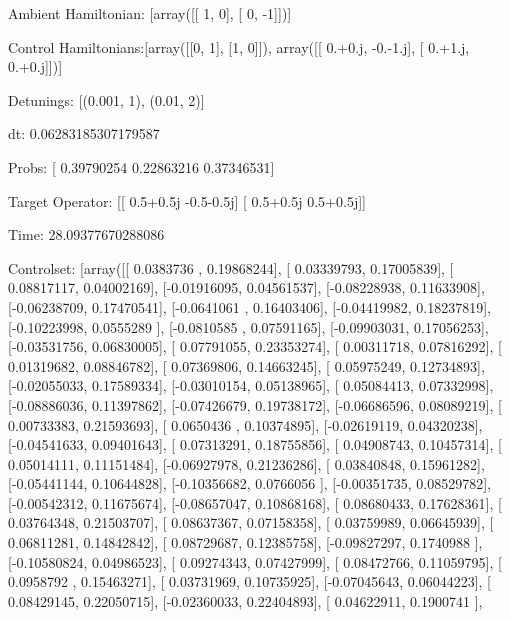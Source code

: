 \documentclass{article}
\begin{document}
    

\newpage

Ambient Hamiltonian: [array([[ 1,  0],
       [ 0, -1]])]

Control Hamiltonians:[array([[0, 1],
       [1, 0]]), array([[ 0.+0.j, -0.-1.j],
       [ 0.+1.j,  0.+0.j]])]

Detunings: [(0.001, 1), (0.01, 2)]

 dt: 0.06283185307179587

Probs: [ 0.39790254  0.22863216  0.37346531]

Target Operator: [[ 0.5+0.5j -0.5-0.5j]
 [ 0.5+0.5j  0.5+0.5j]]

Time: 28.09377670288086

Controlset: [array([[ 0.0383736 ,  0.19868244],
       [ 0.03339793,  0.17005839],
       [ 0.08817117,  0.04002169],
       [-0.01916095,  0.04561537],
       [-0.08228938,  0.11633908],
       [-0.06238709,  0.17470541],
       [-0.0641061 ,  0.16403406],
       [-0.04419982,  0.18237819],
       [-0.10223998,  0.0555289 ],
       [-0.0810585 ,  0.07591165],
       [-0.09903031,  0.17056253],
       [-0.03531756,  0.06830005],
       [ 0.07791055,  0.23353274],
       [ 0.00311718,  0.07816292],
       [ 0.01319682,  0.08846782],
       [ 0.07369806,  0.14663245],
       [ 0.05975249,  0.12734893],
       [-0.02055033,  0.17589334],
       [-0.03010154,  0.05138965],
       [ 0.05084413,  0.07332998],
       [-0.08886036,  0.11397862],
       [-0.07426679,  0.19738172],
       [-0.06686596,  0.08089219],
       [ 0.00733383,  0.21593693],
       [ 0.0650436 ,  0.10374895],
       [-0.02619119,  0.04320238],
       [-0.04541633,  0.09401643],
       [ 0.07313291,  0.18755856],
       [ 0.04908743,  0.10457314],
       [ 0.05014111,  0.11151484],
       [-0.06927978,  0.21236286],
       [ 0.03840848,  0.15961282],
       [-0.05441144,  0.10644828],
       [-0.10356682,  0.0766056 ],
       [-0.00351735,  0.08529782],
       [-0.00542312,  0.11675674],
       [-0.08657047,  0.10868168],
       [ 0.08680433,  0.17628361],
       [ 0.03764348,  0.21503707],
       [ 0.08637367,  0.07158358],
       [ 0.03759989,  0.06645939],
       [ 0.06811281,  0.14842842],
       [ 0.08729687,  0.12385758],
       [-0.09827297,  0.1740988 ],
       [-0.10580824,  0.04986523],
       [ 0.09274343,  0.07427999],
       [ 0.08472766,  0.11059795],
       [ 0.0958792 ,  0.15463271],
       [ 0.03731969,  0.10735925],
       [-0.07045643,  0.06044223],
       [ 0.08429145,  0.22050715],
       [-0.02360033,  0.22404893],
       [ 0.04622911,  0.1900741 ],
\end{document}
